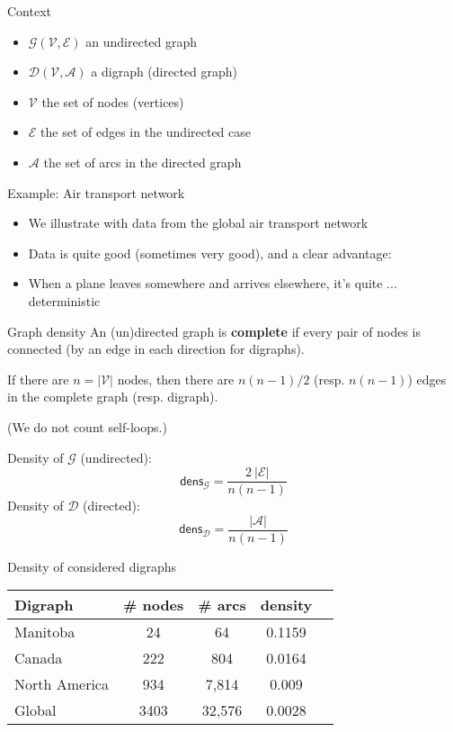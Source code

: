 \documentclass[aspectratio=169]{beamer}\usepackage[]{graphicx}\usepackage[]{xcolor}
\begin{document}
\begin{frame}{Context}
  \begin{itemize}
    \item $\mathcal{G}(\mathcal{V},\mathcal{E})$ an undirected graph
    \item $\mathcal{D}(\mathcal{V},\mathcal{A})$ a digraph (directed graph)
    \item $\mathcal{V}$ the set of nodes (vertices)
    \item $\mathcal{E}$ the set of edges in the undirected case
    \item $\mathcal{A}$ the set of arcs in the directed graph
  \end{itemize}
\end{frame}

\begin{frame}{Example: Air transport network}
  \begin{itemize}
    \item We illustrate with data from the global air transport network
    \item Data is quite good (sometimes very good), and a clear advantage:
    \item When a plane leaves somewhere and arrives elsewhere, it's quite ... deterministic
  \end{itemize}
\end{frame}


\begin{frame}{Graph density}
  An (un)directed graph is \textbf{complete} if every pair of nodes is connected (by an edge in each direction for digraphs).
  
  If there are $n=|\mathcal{V}|$ nodes, then there are $n(n-1)/2$ (resp. $n(n-1)$) edges in the complete graph (resp. digraph).
  
  (We do not count self-loops.)
  
  Density of $\mathcal{G}$ (undirected):
  $$
  \mathsf{dens}_\mathcal{G}=\frac{2\ |\mathcal{E}|}{n(n-1)}
  $$
  Density of $\mathcal{D}$ (directed):
  $$
  \mathsf{dens}_\mathcal{D}=\frac{|\mathcal{A}|}{n(n-1)}
  $$
\end{frame}

\begin{frame}{Density of considered digraphs}
  \begin{tabular}{lcccc}
    Digraph & \# nodes & \# arcs & density \\
    \hline
    Manitoba & 24 & 64 & 0.1159 \\
    Canada & 222 & 804 & 0.0164 \\
    North America & 934 & 7,814 & 0.009 \\
    Global & 3403 & 32,576 & 0.0028 \\
  \end{tabular}
\end{frame}
\end{document}
